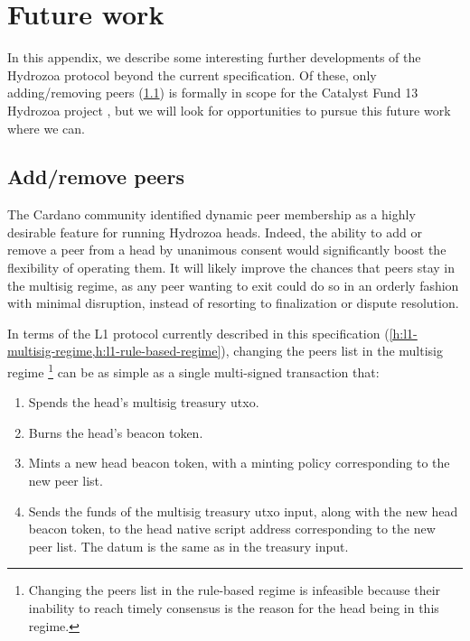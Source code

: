 \documentclass[../hydrozoa.tex]{subfiles}
\begin{document}
\chapter{Future work}%
\label{h:future-work}%

In this appendix, we describe some interesting further developments of the Hydrozoa protocol beyond the current specification.
Of these, only adding/removing peers (\cref{h:future-work-add-remove-members}) is formally in scope for the Catalyst Fund 13 Hydrozoa project \citep{FlerovskyCatalystMilestonesHydrozoa2024}, but we will look for opportunities to pursue this future work where we can.

\section{Add/remove peers}%
\label{h:future-work-add-remove-members}%

The Cardano community identified dynamic peer membership as a highly desirable feature for running Hydrozoa heads.
Indeed, the ability to add or remove a peer from a head by unanimous consent would significantly boost the flexibility of operating them.
It will likely improve the chances that peers stay in the multisig regime, as any peer wanting to exit could do so in an orderly fashion with minimal disruption, instead of resorting to finalization or dispute resolution.

In terms of the L1 protocol currently described in this specification (\cref{h:l1-multisig-regime,h:l1-rule-based-regime}), changing the peers list in the multisig regime%
  \footnote{Changing the peers list in the rule-based regime is infeasible because their inability to reach timely consensus is the reason for the head being in this regime.}
  can be as simple as a single multi-signed transaction that:
\begin{enumerate}
  \item Spends the head's multisig treasury utxo.  
  \item Burns the head's beacon token.
  \item Mints a new head beacon token, with a minting policy corresponding to the new peer list.
  \item Sends the funds of the multisig treasury utxo input, along with the new head beacon token, to the head native script address corresponding to the new peer list.
    The datum is the same as in the treasury input.
\end{enumerate}
\end{document}
